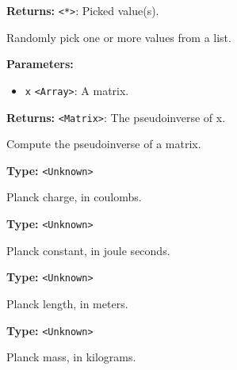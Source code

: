 \documentclass[12pt,a4paper]{article}
\begin{document}
\noindent \textbf{Returns:} \texttt{<*>}: Picked value(s).

\noindent Randomly pick one or more values from a list.

\vspace{5mm}
\noindent {}


\noindent \textbf{Parameters:}
\begin{itemize}
  \item \texttt{x} \texttt{<Array>}: A matrix.
\end{itemize}

\noindent \textbf{Returns:} \texttt{<Matrix>}: The pseudoinverse of x.

\noindent Compute the pseudoinverse of a matrix.

\vspace{5mm}
\noindent {}\vspace{4mm}


\noindent \textbf{Type:} \texttt{<Unknown>}

\noindent Planck charge, in coulombs.

\vspace{5mm}
\noindent {}\vspace{4mm}


\noindent \textbf{Type:} \texttt{<Unknown>}

\noindent Planck constant, in joule seconds.

\vspace{5mm}
\noindent {}\vspace{4mm}


\noindent \textbf{Type:} \texttt{<Unknown>}

\noindent Planck length, in meters.

\vspace{5mm}
\noindent {}\vspace{4mm}


\noindent \textbf{Type:} \texttt{<Unknown>}

\noindent Planck mass, in kilograms.
\end{document}
